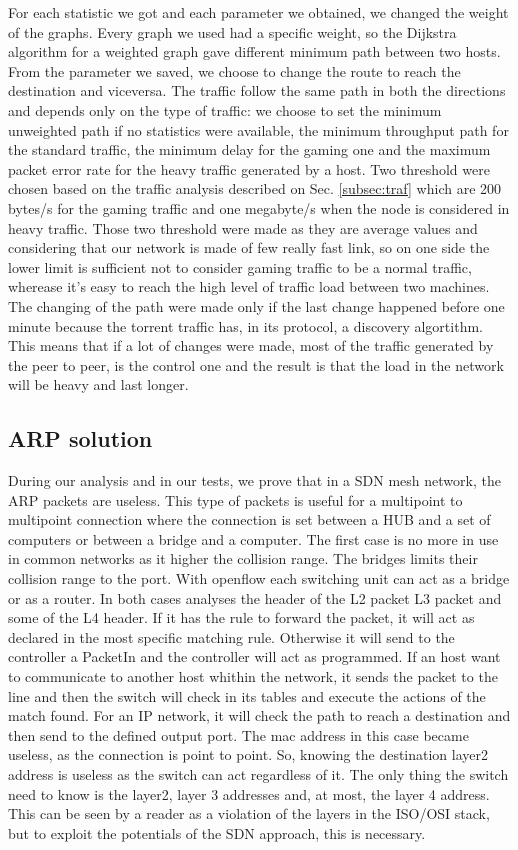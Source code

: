 \documentclass[article,10pt]{IEEEtran}
\begin{document}
For each statistic we got and each parameter we obtained, we changed the weight of the graphs. Every graph we used had a specific weight, so the
Dijkstra algorithm for a weighted graph gave different minimum path between two hosts. From the parameter we saved, we choose to change the
route to reach the destination and viceversa. The traffic follow the same path in both the directions and depends only on the type of traffic:
we choose to set the minimum unweighted path if no statistics were available, the minimum throughput path for the standard traffic, the minimum
delay for the gaming one and the maximum packet error rate for the heavy traffic generated by a host.
Two threshold were chosen based on the traffic analysis described on Sec. \ref{subsec:traf} which are 200 bytes/s for the gaming traffic and one megabyte/s
when the node is considered in heavy traffic. Those two threshold were made as they are average values and considering that our network is made of few really fast link,
so on one side the lower limit is sufficient not to consider gaming traffic to be a normal traffic, wherease it's easy to reach the high level of traffic load between two machines.
The changing of the path were made only if the last change happened before one minute because the torrent traffic has, in its protocol, a discovery
algortithm. This means that if a lot of changes were made, most of the traffic generated by the peer to peer, is the control one and the result is that the
load in the network will be heavy and last longer.

\subsection{ARP solution}
During our analysis and in our tests, we prove that in a SDN mesh network, the ARP packets are useless.
This type of packets is useful for a multipoint to multipoint connection where the connection is set between a
HUB and a set of computers or between a bridge and a computer. The first case is no more in use in common networks as
it higher the collision range. The bridges limits their collision range to the port. With openflow each switching unit can
act as a bridge or as a router. In both cases analyses the header of the L2 packet L3 packet and some of the L4 header.
If it has the rule to forward the packet, it will act as declared in the most specific matching rule. Otherwise it will
send to the controller a PacketIn and the controller will act as programmed. If an host want to communicate to another host whithin
the network, it sends the packet to the line and then the switch will check in its tables and execute the actions of the match found.
For an IP network, it will check the path to reach a destination and then send to the defined output port. The mac address in this case
became useless, as the connection is point to point. So, knowing the destination layer2 address is useless as the switch can act
regardless of it. The only thing the switch need to know is the layer2, layer 3 addresses and, at most, the layer 4 address.
This can be seen by a reader as a violation of the layers in the ISO/OSI stack, but to exploit the potentials of the SDN approach,
this is necessary.
\end{document}
